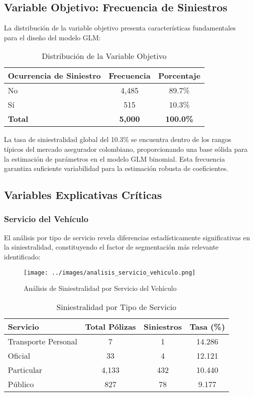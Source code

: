\subsection{Variable Objetivo: Frecuencia de Siniestros}

La distribución de la variable objetivo presenta características fundamentales para el diseño del modelo GLM:

\begin{table}[H]
\centering
\caption{Distribución de la Variable Objetivo}
\begin{tabular}{|l|c|c|}
\hline
\textbf{Ocurrencia de Siniestro} & \textbf{Frecuencia} & \textbf{Porcentaje} \\
\hline
No & 4,485 & 89.7\% \\
Sí & 515 & 10.3\% \\
\hline
\textbf{Total} & \textbf{5,000} & \textbf{100.0\%} \\
\hline
\end{tabular}
\end{table}

La tasa de siniestralidad global del 10.3\% se encuentra dentro de los rangos típicos del mercado asegurador colombiano, proporcionando una base sólida para la estimación de parámetros en el modelo GLM binomial. Esta frecuencia garantiza suficiente variabilidad para la estimación robusta de coeficientes.

\subsection{Variables Explicativas Críticas}

\subsubsection{Servicio del Vehículo}

El análisis por tipo de servicio revela diferencias estadísticamente significativas en la siniestralidad, constituyendo el factor de segmentación más relevante identificado:

\begin{figure}[H]
\centering
\texttt{[image: ../images/analisis\_servicio\_vehiculo.png]}
\caption{Análisis de Siniestralidad por Servicio del Vehículo}
\end{figure}

\begin{table}[H]
\centering
\caption{Siniestralidad por Tipo de Servicio}
\begin{tabular}{|l|c|c|c|}
\hline
\textbf{Servicio} & \textbf{Total Pólizas} & \textbf{Siniestros} & \textbf{Tasa (\%)} \\
\hline
Transporte Personal & 7 & 1 & 14.286 \\
Oficial & 33 & 4 & 12.121 \\
Particular & 4,133 & 432 & 10.440 \\
Público & 827 & 78 & 9.177 \\
\hline
\end{tabular}
\end{table}

